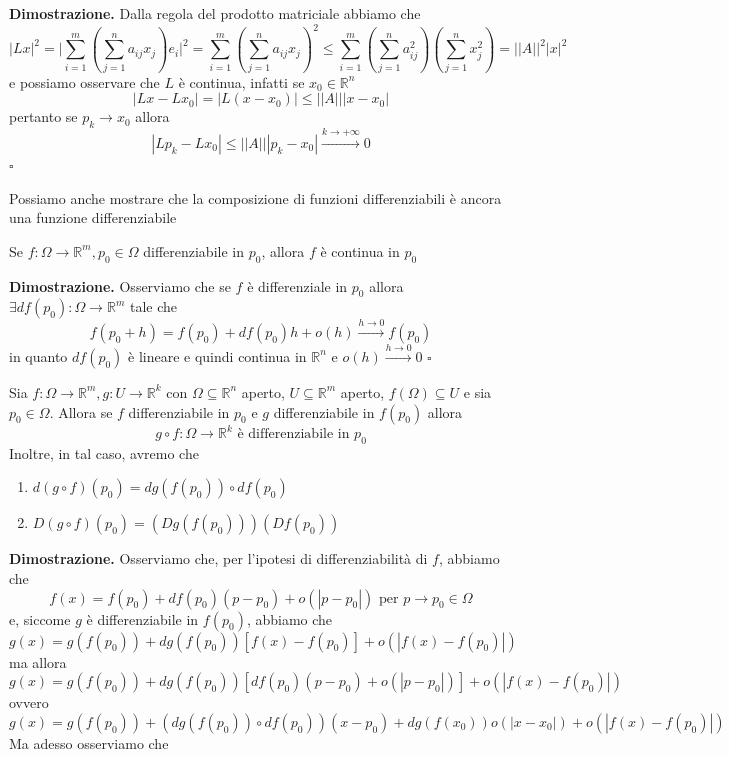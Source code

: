 \noindent \textbf{Dimostrazione. }
Dalla regola del prodotto matriciale abbiamo che
$$
|Lx|^2 = \Bigg| \sum_{i=1}^m \left( \sum_{j=1}^n a_{ij} x_j \right)e_i \Bigg|^2 = \sum_{i=1}^m \left( \sum_{j=1}^n a_{ij} x_j \right)^2 \leq \sum_{i=1}^m \left( \sum_{j=1}^n a_{ij}^2 \right)  \left( \sum_{j=1}^n x_j^2 \right) = || A ||^2 |x|^2
$$
e possiamo osservare che $L$ è continua, infatti se $x_0 \in \mathbb{R}^n$
$$
|Lx - Lx_0| = |L(x-x_0)| \leq || A || |x-x_0|
$$
pertanto se $p_k \to x_0$ allora
$$
|Lp_k - Lx_0| \leq || A || |p_k-x_0| \stackrel{k \to +\infty}{\to} 0
$$
\hfill $\square$

Possiamo anche mostrare che la composizione di funzioni differenziabili è ancora una funzione differenziabile

\begin{prop}
Se $f: \Omega \to \mathbb{R}^m, p_0 \in \Omega$ differenziabile in $p_0$, allora $f$ è continua in $p_0$
\end{prop}

\noindent \textbf{Dimostrazione. }
Osserviamo che se $f$ è differenziale in $p_0$ allora $\exists df(p_0): \Omega \to \mathbb{R}^m$ tale che
$$
f(p_0 + h) = f(p_0) + df(p_0)h + o(h) \stackrel{h \to 0}{\to} f(p_0)
$$
in quanto $df(p_0)$ è lineare e quindi continua in $\mathbb{R}^n$ e $o(h) \stackrel{h \to 0}{\to} 0$
\hfill $\square$

\vspace{0.5cm}
\begin{theorem}[\textcolor{blue}{differenziale della composizione}]
Sia $f: \Omega \to \mathbb{R}^m, g: U \to \mathbb{R}^k$ con $\Omega \subseteq \mathbb{R}^n$ aperto, $U \subseteq \mathbb{R}^m$ aperto, $f(\Omega) \subseteq U$ e sia $p_0 \in \Omega$. Allora se $f$ differenziabile in $p_0$ e $g$ differenziabile in $f(p_0)$ allora
$$
g \circ f: \Omega \to \mathbb{R}^k \text{ è differenziabile in } p_0
$$
Inoltre, in tal caso, avremo che

\begin{enumerate}[label=\protect\circled{\arabic*}]
	\item $d(g \circ f)(p_0) = dg(f(p_0)) \circ df(p_0)$
	\item $D(g \circ f)(p_0) = (Dg(f(p_0)))(Df(p_0))$
\end{enumerate}
\end{theorem}

\noindent \textbf{Dimostrazione. }
Osserviamo che, per l'ipotesi di differenziabilità di $f$, abbiamo che
$$
f(x) = f(p_0) + df(p_0)(p-p_0) + o(|p-p_0|) \text{ per } p \to p_0 \in \Omega
$$
e, siccome $g$ è differenziabile in $f(p_0)$, abbiamo che
$$
g(x) = g(f(p_0)) + dg(f(p_0))[f(x) - f(p_0)] + o(|f(x) - f(p_0)|)
$$
ma allora
$$
g(x) = g(f(p_0)) + dg(f(p_0))[df(p_0)(p-p_0) + o(|p-p_0|)] + o(|f(x) - f(p_0)|)
$$
ovvero
$$
g(x) = g(f(p_0)) + \left( dg(f(p_0)) \circ df(p_0) \right) (x - p_0) + dg(f(x_0))o(|x-x_0|) + o(|f(x)-f(p_0)|) 
$$
Ma adesso osserviamo che

